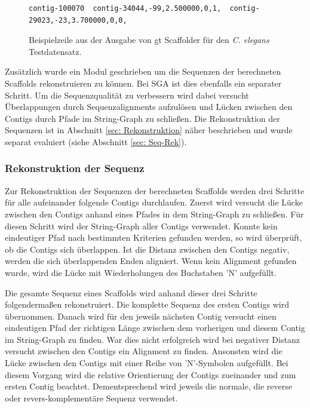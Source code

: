 \documentclass[a4paper,11pt,parskip,abstract=on]{scrartcl}
\begin{document}
\begin{figure}
\begin{verbatim}
contig-100070  contig-34044,-99,2.500000,0,1,  contig-29023,-23,3.700000,0,0,
\end{verbatim}
\caption{\label{abb: scaf}Beispielzeile aus der Ausgabe von gt
  Scaffolder für den \textit{C. elegans} Testdatensatz.}
\end{figure}

Zusätzlich wurde ein Modul geschrieben um die Sequenzen der
berechneten Scaffolds rekonstruieren zu können. Bei SGA ist dies
ebenfalls ein separater Schritt. Um die Sequenzqualität zu verbessern
wird dabei versucht Überlappungen durch Sequenzalignments aufzulösen
und Lücken zwischen den Contigs durch Pfade im String-Graph zu
schließen. Die Rekonstruktion der Sequenzen ist in Abschnitt \ref{sec:
  Rekonstruktion} näher beschrieben und wurde separat evaluiert (siehe
Abschnitt \ref{sec: Seq-Rek}).

\subsubsection{Rekonstruktion der Sequenz}
\label{sec: Rekonstruktion}
Zur Rekonstruktion der Sequenzen der berechneten Scaffolds werden drei
Schritte für alle aufeinander folgende Contigs durchlaufen. Zuerst
wird versucht die Lücke zwischen den Contigs anhand eines Pfades
in dem String-Graph zu schließen. Für diesen Schritt wird der
String-Graph aller Contigs verwendet. Konnte kein eindeutiger Pfad nach
bestimmten Kriterien gefunden werden, so wird überprüft, ob die
Contigs sich überlappen. Ist die Distanz zwischen den Contigs negativ,
werden die sich überlappenden Enden aligniert. Wenn kein Alignment
gefunden wurde, wird die Lücke mit Wiederholungen des Buchstaben 'N'
aufgefüllt.

Die gesamte Sequenz eines Scaffolds wird anhand dieser drei Schritte
folgendermaßen rekonstruiert. Die komplette Sequenz des ersten Contigs
wird übernommen. Danach wird für den jeweils nächsten Contig versucht
einen eindeutigen Pfad der richtigen Länge zwischen dem vorherigen und
diesem Contig im String-Graph zu finden. War dies nicht erfolgreich
wird bei negativer Distanz versucht zwischen den Contigs ein Alignment
zu finden. Ansonsten wird die Lücke zwischen den Contigs mit einer Reihe
von 'N'-Symbolen aufgefüllt. Bei diesem Vorgang wird die relative
Orientierung der Contigs zueinander und zum ersten Contig
beachtet. Dementsprechend wird jeweils die normale, die reverse oder
revers-komplementäre Sequenz verwendet.
\end{document}

